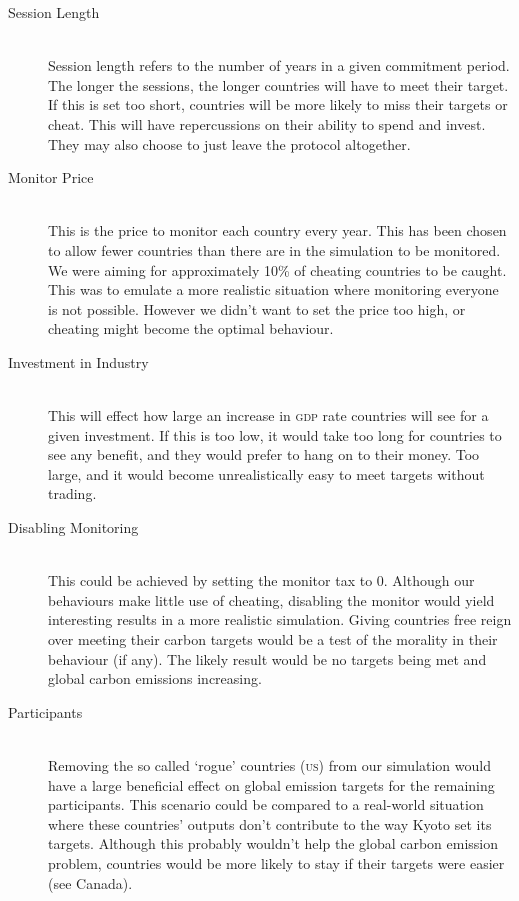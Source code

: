 \begin{description}
\item[Session Length] \hfill \\

Session length refers to the number of years in a given commitment period. The longer the sessions, the longer countries will have to meet their target. If this is set too short, countries will be more likely to miss their targets or cheat. This will have repercussions on their ability to spend and invest. They may also choose to just leave the protocol altogether.

\item[Monitor Price] \hfill \\

This is the price to monitor each country every year. This has been chosen to allow fewer countries than there are in the simulation to be monitored. We were aiming for approximately 10\% of cheating countries to be caught. This was to emulate a more realistic situation where monitoring everyone is not possible. However we didn't want to set the price too high, or cheating might become the optimal behaviour.

\item[Investment in Industry] \hfill \\

This will effect how large an increase in \textsc{gdp} rate countries will see for a given investment. If this is too low, it would take too long for countries to see any benefit, and they would prefer to hang on to their money. Too large, and it would become unrealistically easy to meet targets without trading.

\item[Disabling Monitoring] \hfill \\

This could be achieved by setting the monitor tax to 0. Although our behaviours make little use of cheating, disabling the monitor would yield interesting results in a more realistic simulation. Giving countries free reign over meeting their carbon targets would be a test of the morality in their behaviour (if any). The likely result would be no targets being met and global carbon emissions increasing.

\item[Participants] \hfill \\

Removing the so called `rogue' countries (\textsc{us}) from our simulation would have a large beneficial effect on global emission targets for the remaining participants. This scenario could be compared to a real-world situation where these countries' outputs don't contribute to the way Kyoto set its targets. Although this probably wouldn't help the global carbon emission problem, countries would be more likely to stay if their targets were easier (see Canada).


\end{description}
